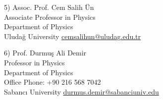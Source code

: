 \documentclass[]{friggeri-cv}
\begin{document}
\begin{entrylist}
	
	    \entry
		{5)}
		{Assoc. Prof. Cem Salih Ün  \\ \normalfont
		Associate Professor in Physics \\		
		Department of Physics \\			
		Uludağ University}
		{\href{cemsalihun@uludag.edu.tr}{cemsalihun@uludag.edu.tr}} 		

	    \entry
		{6)}
		{Prof. Durmuş Ali Demir  \\ \normalfont
		Professor in Physics \\		
		Department of Physics \\
	    Office Phone: +90 216 568 7042 \\						
		Sabancı University}
		{\href{durmus.demir@sabanciuniv.edu}{durmus.demir@sabanciuniv.edu}} 		


	\end{entrylist}
\end{document}
